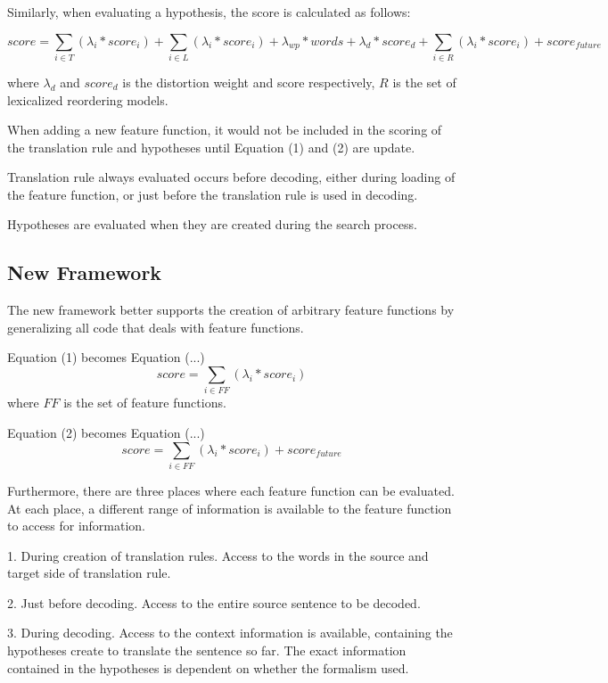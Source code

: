 \documentclass{pbml}
\begin{document}
Similarly, when evaluating a hypothesis, the score is calculated as follows:

\begin{equation}
 score =  \sum_{i \in T} (\lambda_i * score_i)
    + \sum_{i \in L} (\lambda_i * score_i)
    + \lambda_{wp} * words
    + \lambda_d * score_d
    + \sum_{i \in R}(\lambda_i * score_i)
    + score_{future}
\end{equation}

where $\lambda_d$ and $score_d$ is the distortion weight and score respectively, $R$ is the set of lexicalized reordering models.

When adding a new feature function, it would not be included in the scoring of the translation rule and hypotheses until Equation (1) and (2) are update.

Translation rule always evaluated occurs before decoding, either during loading of the feature function, or just before the translation rule is used in decoding.

Hypotheses are evaluated when they are created during the search process.

\subsection{New Framework}
The new framework better supports the creation of arbitrary feature functions by generalizing all code that deals with feature functions.

Equation (1) becomes Equation (...)
\begin{equation}
  score = \sum_{i \in FF}(\lambda_i * score_i)
\end{equation}
where $FF$ is the set of feature functions.

Equation (2) becomes Equation (...)
\begin{equation}
  score =  \sum_{i \in FF}(\lambda_i * score_i)
	  + score_{future}
\end{equation}

Furthermore, there are three places where each feature function can be evaluated. At each place, a different range of information is available to the feature function to access for information.

    1. During creation of translation rules. Access to the words in the source and target side of translation rule.

    2. Just before decoding. Access to the entire source sentence to be decoded.

    3. During decoding. Access to the context information is available, containing the hypotheses create to translate the sentence so far. The exact information contained in the hypotheses is dependent on whether the formalism used.
\end{document}
